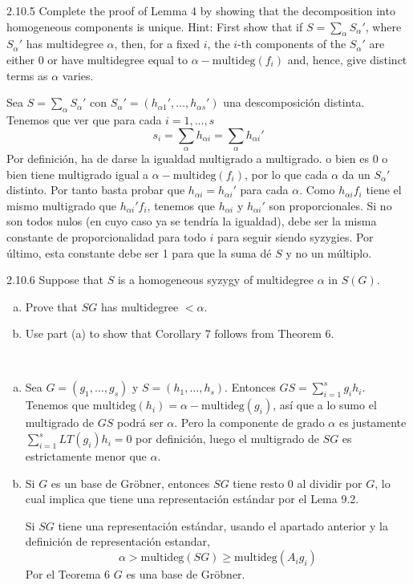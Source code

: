 \documentclass[twoside]{article}
\begin{document}
\begin{ejercicio}{2.10.5}
Complete the proof of Lemma 4 by showing that the decomposition into homogeneous
components is unique. Hint: First show that if $S =
\sum_{α} S_{α}'$, where $S_{α}'$ has multidegree
$α$, then, for a fixed $i$, the $i$-th components of the $S_{α}'$ are either 0 or have multidegree equal
to $α − \textrm{multideg}( f_i)$ and, hence, give distinct terms as $α$ varies.
\end{ejercicio}
\begin{solucion}
Sea $S=\sum_\alpha S_\alpha'$ con $S_\alpha'=(h_{\alpha 1}',\dots,h_{\alpha s}')$ una descomposición distinta. Tenemos que ver que para cada $i=1,\dotsc,s$
$$
s_i = \sum_\alpha h_{\alpha i} = \sum_\alpha h_{\alpha i}'
$$
Por definición, ha de darse la igualdad multigrado a multigrado.	 o bien es 0 o bien tiene multigrado igual a $α − \textrm{multideg}( f_i)$, por lo que cada $\alpha$ da un $S_\alpha'$ distinto. Por tanto basta probar que $h_{\alpha i}=h_{\alpha i}'$ para cada $\alpha$. Como $h_{\alpha i}f_i$ tiene el mismo multigrado que $h_{\alpha i}'f_i$, tenemos que  $h_{\alpha i}$ y $h_{\alpha i}'$ son proporcionales. Si no son todos nulos (en cuyo caso ya se tendría la igualdad), debe ser la misma constante de proporcionalidad para todo $i$ para seguir siendo syzygies. Por último, esta constante debe ser 1 para que la suma dé $S$ y no un múltiplo. 
\end{solucion}

\newpage

\begin{ejercicio}{2.10.6}
Suppose that $S$ is a homogeneous syzygy of multidegree $α$ in $S(G)$.
\begin{enumerate}[a.]
\item Prove that $S  G$ has multidegree $< α$.
\item Use part (a) to show that Corollary 7 follows from Theorem 6.
\end{enumerate}
\end{ejercicio}
\begin{solucion}\
\begin{enumerate}[a.]
\item Sea $G=(g_1,\dots, g_s)$ y $S=(h_1,\dots, h_s)$. Entonces $GS=\sum_{i=1}^s g_ih_i$. Tenemos que $\mathrm{multideg}(h_i)=\alpha-\mathrm{multideg}(g_i)$, así que a lo sumo el multigrado de $GS$ podrá ser $\alpha$. Pero la componente de grado $\alpha$ es justamente $\sum_{i=1}^s LT(g_i)h_i=0$ por definición, luego el multigrado de $SG$ es estrictamente menor que $\alpha$. 

\item Si $G$ es un base de Gröbner, entonces $SG$ tiene resto 0 al dividir por $G$, lo cual implica que tiene una representación estándar por el Lema 9.2.

Si $SG$ tiene una representación estándar, usando el apartado anterior y la definición de representación estandar,
$$\alpha>\mathrm{multideg}(SG)\geq \mathrm{multideg}(A_ig_i)$$
Por el Teorema 6 $G$ es una base de Gröbner. 
\end{enumerate}
\end{solucion}
\end{document}

